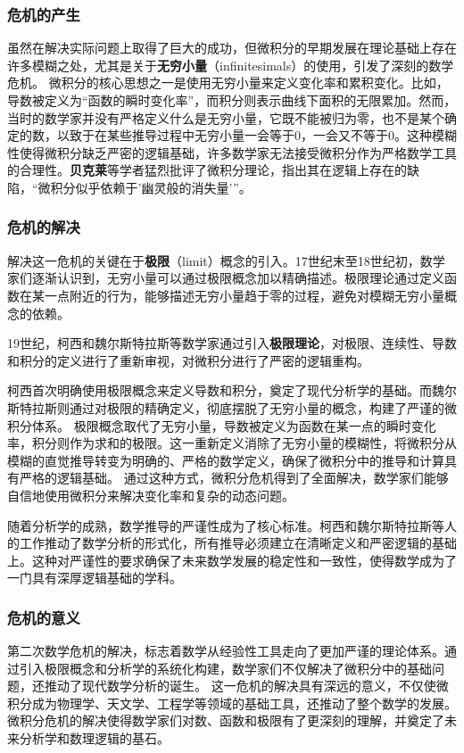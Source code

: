 \subsubsection{危机的产生}
虽然在解决实际问题上取得了巨大的成功，但微积分的早期发展在理论基础上存在许多模糊之处，尤其是关于{\bf 无穷小量}（infinitesimals）的使用，引发了深刻的数学危机。
微积分的核心思想之一是使用无穷小量来定义变化率和累积变化。比如，导数被定义为“函数的瞬时变化率”，而积分则表示曲线下面积的无限累加。然而，当时的数学家并没有严格定义什么是无穷小量，它既不能被归为零，也不是某个确定的数，以致于在某些推导过程中无穷小量一会等于0，一会又不等于0。这种模糊性使得微积分缺乏严密的逻辑基础，许多数学家无法接受微积分作为严格数学工具的合理性。{\bf 贝克莱}等学者猛烈批评了微积分理论，指出其在逻辑上存在的缺陷，“微积分似乎依赖于'幽灵般的消失量'”。

\subsubsection{危机的解决}
解决这一危机的关键在于{\bf 极限}（limit）概念的引入。17世纪末至18世纪初，数学家们逐渐认识到，无穷小量可以通过极限概念加以精确描述。极限理论通过定义函数在某一点附近的行为，能够描述无穷小量趋于零的过程，避免对模糊无穷小量概念的依赖。

19世纪，柯西和魏尔斯特拉斯等数学家通过引入{\bf 极限理论}，对极限、连续性、导数和积分的定义进行了重新审视，对微积分进行了严密的逻辑重构。

柯西首次明确使用极限概念来定义导数和积分，奠定了现代分析学的基础。而魏尔斯特拉斯则通过对极限的精确定义，彻底摆脱了无穷小量的概念，构建了严谨的微积分体系。
极限概念取代了无穷小量，导数被定义为函数在某一点的瞬时变化率，积分则作为求和的极限。这一重新定义消除了无穷小量的模糊性，将微积分从模糊的直觉推导转变为明确的、严格的数学定义，确保了微积分中的推导和计算具有严格的逻辑基础。
通过这种方式，微积分危机得到了全面解决，数学家们能够自信地使用微积分来解决变化率和复杂的动态问题。

随着分析学的成熟，数学推导的严谨性成为了核心标准。柯西和魏尔斯特拉斯等人的工作推动了数学分析的形式化，所有推导必须建立在清晰定义和严密逻辑的基础上。这种对严谨性的要求确保了未来数学发展的稳定性和一致性，使得数学成为了一门具有深厚逻辑基础的学科。
\subsubsection{危机的意义}
第二次数学危机的解决，标志着数学从经验性工具走向了更加严谨的理论体系。通过引入极限概念和分析学的系统化构建，数学家们不仅解决了微积分中的基础问题，还推动了现代数学分析的诞生。
这一危机的解决具有深远的意义，不仅使微积分成为物理学、天文学、工程学等领域的基础工具，还推动了整个数学的发展。微积分危机的解决使得数学家们对数、函数和极限有了更深刻的理解，并奠定了未来分析学和数理逻辑的基石。

